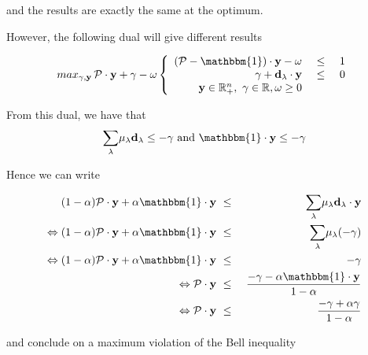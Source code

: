 and the results are exactly the same at the optimum.
\vspace{2cm}

However, the following dual will give different results 

\begin{equation}
    \displaystyle{ max_{\gamma,\mathbf{y}} \,  \mathcal{P}\cdot \mathbf{y} + \gamma  -\omega } \\

\left\{
\begin{array}{rcl}
 (\mathcal{P} - \mathbbm{1}) \cdot \mathbf{y} -\omega &\ \leq \ & 1\\
 \gamma  + \mathbf{d_\lambda} \cdot \mathbf{y} &\ \leq \ & 0\\

\mathbf{y} \in \mathbb{R}_+^n ,\ \gamma \in \mathbb{R}, \omega \geq 0  & &
\end{array}
\right.
\label{eq:dual}

\end{equation}


From this dual, we have that 
\begin{equation}
    \displaystyle{\sum_\lambda} \mu_\lambda \mathbf{d_\lambda} \leq -\gamma  \text{ and } \mathbbm{1}\cdot\mathbf{y} \leq - \gamma
\end{equation}

Hence we can write 

\begin{eqnarray*}
  \text{ } (1-\alpha) \mathcal{P}\cdot \mathbf{y}+ \alpha \mathbbm{1} \cdot \mathbf{y}&\ \leq \ & \displaystyle{\sum_\lambda} \mu_\lambda \mathbf{d_\lambda}\cdot \mathbf{y} \\
 \Leftrightarrow (1-\alpha) \mathcal{P}\cdot \mathbf{y}+ \alpha \mathbbm{1} \cdot \mathbf{y}&\ \leq \ &  \displaystyle{\sum_\lambda} \mu_\lambda (- \gamma) \\
 \Leftrightarrow (1-\alpha) \mathcal{P}\cdot \mathbf{y}+ \alpha \mathbbm{1}\cdot \mathbf{y} &\ \leq \ &   - \gamma \\
 \Leftrightarrow  \mathcal{P}\cdot \mathbf{y}   &\ \leq \ & \dfrac{- \gamma - \alpha \mathbbm{1} \cdot\mathbf{y}}{1-\alpha} \\
 \Leftrightarrow   \mathcal{P}\cdot \mathbf{y}   &\ \leq \ &   \dfrac{- \gamma + \alpha \gamma}{1-\alpha} \\
\end{eqnarray*}

and conclude on a maximum violation of the Bell inequality










